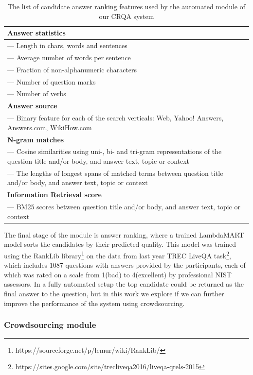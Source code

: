 \begin{table}[ht]
\centering
\begin{tabular}{| p{12cm} |}
\hline
\textbf{Answer statistics} \\
\hline
--- Length in chars, words and sentences \\
--- Average number of words per sentence \\
--- Fraction of non-alphanumeric characters  \\
--- Number of question marks \\
--- Number of verbs  \\
\hline
\textbf{Answer source} \\
\hline
--- Binary feature for each of the search verticals: Web, Yahoo! Answers, Answers.com, WikiHow.com \\
\hline
\textbf{N-gram matches}\\
\hline
--- Cosine similarities using uni-, bi- and tri-gram representations of the question title and/or body, and answer text, topic or context\\
--- The lengths of longest spans of matched terms between question title and/or body, and answer text, topic or context\\
\hline
\textbf{Information Retrieval score}\\
\hline
--- BM25 scores between question title and/or body, and answer text, topic or context\\ 
\hline
\end{tabular}
\caption{The list of candidate answer ranking features used by the automated module of our CRQA system}
\label{table:crowdsourcing:crqa:features}
\end{table}

The final stage of the module is answer ranking, where a trained LambdaMART \cite{burges2010ranknet} model sorts the candidates by their predicted quality.
This model was trained using the RankLib library\footnote{https://sourceforge.net/p/lemur/wiki/RankLib/} on the data from last year TREC LiveQA task\footnote{https://sites.google.com/site/trecliveqa2016/liveqa-qrels-2015}, which includes 1087 questions with answers provided by the participants, each of which was rated on a scale from 1(bad) to 4(excellent) by professional NIST assessors.
In a fully automated setup the top candidate could be returned as the final answer to the question, but in this work we explore if we can further improve the performance of the system using crowdsourcing.

\subsubsection{Crowdsourcing module}
\label{section:crowdsourcing:approach:crqa:crowdmodule}

